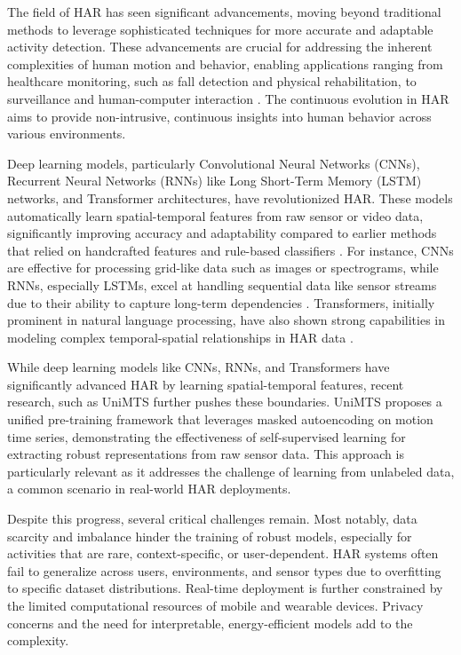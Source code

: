 The field of HAR has seen significant advancements, moving beyond traditional methods to leverage sophisticated techniques for more accurate and adaptable activity detection. These advancements are crucial for addressing the inherent complexities of human motion and behavior, enabling applications ranging from healthcare monitoring, such as fall detection and physical rehabilitation, to surveillance and human-computer interaction \cite{qureshi2025systematic}. The continuous evolution in HAR aims to provide non-intrusive, continuous insights into human behavior across various environments.

Deep learning models, particularly Convolutional Neural Networks (CNNs), Recurrent Neural Networks (RNNs) like Long Short-Term Memory (LSTM) networks, and Transformer architectures, have revolutionized HAR. These models automatically learn spatial-temporal features from raw sensor or video data, significantly improving accuracy and adaptability compared to earlier methods that relied on handcrafted features and rule-based classifiers \cite{zaher2025unlocking}. For instance, CNNs are effective for processing grid-like data such as images or spectrograms, while RNNs, especially LSTMs, excel at handling sequential data like sensor streams due to their ability to capture long-term dependencies \cite{zaher2025unlocking, sherstinsky2020fundamentals}. Transformers, initially prominent in natural language processing, have also shown strong capabilities in modeling complex temporal-spatial relationships in HAR data \cite{han2021transformer}.

While deep learning models like CNNs, RNNs, and Transformers have significantly advanced HAR by learning spatial-temporal features, recent research, such as UniMTS \cite{zhang2024unimts} further pushes these boundaries. UniMTS proposes a unified pre-training framework that leverages masked autoencoding on motion time series, demonstrating the effectiveness of self-supervised learning for extracting robust representations from raw sensor data. This approach is particularly relevant as it addresses the challenge of learning from unlabeled data, a common scenario in real-world HAR deployments.

Despite this progress, several critical challenges remain. Most notably, data scarcity and imbalance hinder the training of robust models, especially for activities that are rare, context-specific, or user-dependent. HAR systems often fail to generalize across users, environments, and sensor types due to overfitting to specific dataset distributions. Real-time deployment is further constrained by the limited computational resources of mobile and wearable devices. Privacy concerns and the need for interpretable, energy-efficient models add to the complexity.

